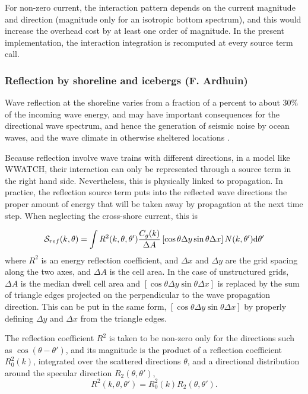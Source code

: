 For non-zero current, the interaction pattern depends on the current magnitude
and direction (magnitude only for an isotropic bottom spectrum), and this
would increase the overhead cost by at least one order of magnitude. In the
present implementation, the interaction integration is recomputed at every
source term call.

\vsssub
\subsubsection{Reflection by shoreline and icebergs  \hfill {\rm (F. Ardhuin)}} 
\label{sec:ref}
\vsssub
Wave reflection at the shoreline varies from a fraction of a percent to about 30\% of the incoming 
wave energy, and may have important consequences for the directional wave spectrum, and hence the 
generation of seismic noise by ocean waves, and the wave climate in otherwise sheltered locations \citep{pro:ORe99}. 

Because reflection involve wave trains with different directions, in a model like WWATCH, their interaction can only be 
represented through a source term in the right hand side. Nevertheless, this is physically linked to propagation. 
In practice, the reflection source term puts into the reflected wave directions the proper amount of energy that will be taken away by propagation 
at the next time step. When neglecting the cross-shore current, this is 

\begin{equation} 
{\cal S}_{ref}(k,\theta) = 
\int R^2(k,\theta,\theta') \frac{C_g(k)}{\Delta A} \left[\cos \theta \Delta y \sin \theta  \Delta x \right] N(k,\theta') \mathrm{d} \theta'
\end{equation}
where $R^2$ is  an energy reflection coefficient, and $\Delta x$ and $\Delta y$ are the grid spacing along the two axes, and
$\Delta A$ is the cell area. In the 
case of unstructured grids, $\Delta A$ is the median dwell cell area and $\left[\cos \theta \Delta y \sin \theta  \Delta x \right]$ 
is replaced by the sum of triangle edges projected on the perpendicular to the wave propagation direction. 
This can be put in the same form,  $\left[\cos \theta \Delta y \sin \theta  \Delta x \right]$ by properly defining 
$\Delta y$ and $\Delta x$ from the triangle edges. 

The reflection coefficient $R^2$ is taken to be non-zero only for the directions such as $\cos(\theta-\theta')$, and its magnitude 
is the product of a reflection coefficient $R_0^2(k)$, integrated over the scattered directions $\theta$, 
and a directional distribution around the specular direction $R_2(\theta,\theta')$,  
\begin{equation} 
R^2(k,\theta,\theta')  =  R_0^2(k) R_2(\theta,\theta').
\end{equation}


